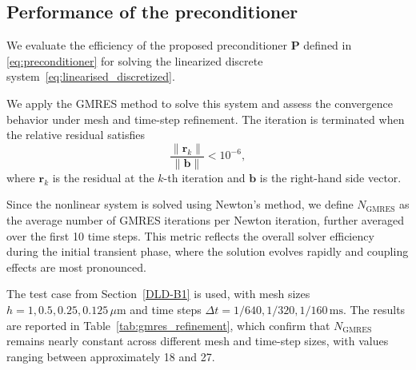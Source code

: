 \documentclass{article}
\begin{document}
\subsection{Performance of the preconditioner}

We evaluate the efficiency of the proposed preconditioner $\mathbf{P}$ defined in \eqref{eq:preconditioner} for solving the linearized discrete system~\eqref{eq:linearised_discretized}.

We apply the GMRES method to solve this system and assess the convergence behavior under mesh and time-step refinement. The iteration is terminated when the relative residual satisfies
\begin{equation}
    \frac{\|\mathbf{r}_k\|}{\|\mathbf{b}\|} < 10^{-6},
\end{equation}
where $\mathbf{r}_k$ is the residual at the $k$-th iteration and $\mathbf{b}$ is the right-hand side vector.

Since the nonlinear system is solved using Newton's method, we define $N_{\text{GMRES}}$ as the average number of GMRES iterations per Newton iteration, further averaged over the first 10 time steps. This metric reflects the overall solver efficiency during the initial transient phase, where the solution evolves rapidly and coupling effects are most pronounced.

The test case from Section~\ref{DLD-B1} is used, with mesh sizes $h = 1, 0.5, 0.25, 0.125\,\mu\mathrm{m}$ and time steps $\Delta t = 1/640, 1/320, 1/160\,\mathrm{ms}$. The results are reported in Table~\ref{tab:gmres_refinement}, 
which confirm that $N_{\text{GMRES}}$ remains nearly constant across different mesh and time-step sizes, with values ranging between approximately 18 and 27. 

\end{document}
